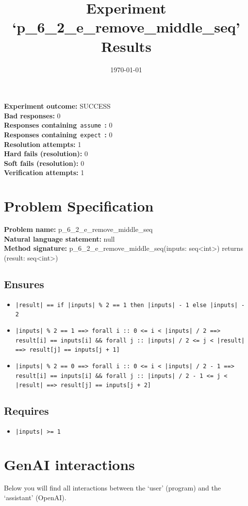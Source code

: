 \documentclass{article}
\begin{document}
\title{Experiment `p\_6\_2\_e\_remove\_middle\_seq' Results}
\author{\today}
\date{}
\maketitle
\textbf{Experiment outcome: }SUCCESS
\\\textbf{Bad responses: }0
\\\textbf{Responses containing}~\texttt{assume}~\textbf{: }0
\\\textbf{Responses containing}~\texttt{expect}~\textbf{: }0
\\\textbf{Resolution attempts: }1
\\\textbf{Hard fails (resolution): }0
\\\textbf{Soft fails (resolution): }0
\\\textbf{Verification attempts: }1
\section*{Problem Specification}
\textbf{Problem name: }p\_6\_2\_e\_remove\_middle\_seq
\\\textbf{Natural language statement: }null
\\\textbf{Method signature: }p\_6\_2\_e\_remove\_middle\_seq(inputs: seq<int>) returns (result: seq<int>)
\subsection*{Ensures}
\begin{itemize}
\item \texttt{|result| == if |inputs| \% 2 == 1 then |inputs| - 1 else |inputs| - 2}
\item \texttt{|inputs| \% 2 == 1 ==> forall i :: 0 <= i < |inputs| / 2 ==> result[i] == inputs[i] \&\& forall j :: |inputs| / 2 <= j < |result| ==> result[j] == inputs[j + 1]}
\item \texttt{|inputs| \% 2 == 0 ==> forall i :: 0 <= i < |inputs| / 2 - 1 ==> result[i] == inputs[i] \&\& forall j :: |inputs| / 2 - 1 <= j < |result| ==> result[j] == inputs[j + 2]}
\end{itemize}
\subsection*{Requires}
\begin{itemize}
\item \texttt{|inputs| >= 1}
\end{itemize}
\clearpage
\section*{GenAI interactions}
Below you will find all interactions between the `user' (program) and the `assistant' (OpenAI).
\end{document}
